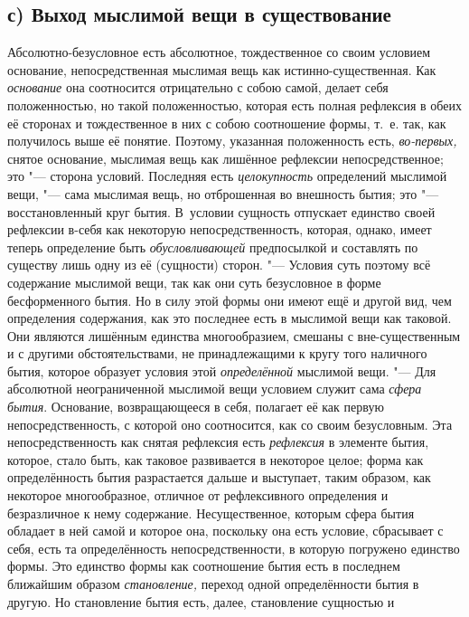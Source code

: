 \subsection%
[с) Выход мыслимой вещи в существование]%
{с) Выход мыслимой вещи в существование}

Абсолютно-безусловное есть абсолютное,
тождественное со своим условием основание, непосредственная мыслимая вещь
как истинно-существенная. Как {\em основание} она
соотносится отрицательно с собою самой, делает себя положенностью, но такой
положенностью, которая есть полная рефлексия в обеих её сторонах и
тождественное в них с собою соотношение формы, т.~е. так, как получилось
выше её понятие. Поэтому, указанная положенность есть,
{\em во-первых,} снятое основание, мыслимая вещь как
лишённое рефлексии непосредственное; это "--- сторона условий. Последняя есть
{\em целокупность} определений мыслимой вещи, "--- сама
мыслимая вещь, но отброшенная во внешность бытия; это "--- восстановленный
круг бытия. В~условии сущность отпускает единство своей рефлексии в-себя
как некоторую непосредственность, которая, однако, имеет теперь определение
быть {\em обусловливающей} предпосылкой и составлять по
существу лишь одну из её (сущности) сторон. "--- Условия суть поэтому всё
содержание мыслимой вещи, так как они суть безусловное в форме
бесформенного бытия. Но в силу этой формы они имеют ещё и другой вид, чем
определения содержания, как это последнее есть в мыслимой вещи как таковой.
Они являются лишённым единства многообразием, смешаны с вне-существенным и
с другими обстоятельствами, не принадлежащими к кругу того наличного бытия,
которое образует условия этой {\em определённой}
мыслимой вещи. "--- Для абсолютной неограниченной мыслимой вещи условием служит
сама {\em сфера бытия}. Основание, возвращающееся в
себя, полагает её как первую непосредственность, с которой оно соотносится,
как со своим безусловным. Эта непосредственность как снятая рефлексия есть
{\em рефлексия} в элементе бытия, которое, стало быть,
как таковое развивается в некоторое целое; форма как определённость бытия
разрастается дальше и выступает, таким образом, как некоторое
многообразное, отличное от рефлексивного определения и безразличное к нему
содержание. Несущественное, которым сфера бытия обладает в ней самой и
которое она, поскольку она есть условие, сбрасывает с себя, есть та
определённость непосредственности, в которую погружено единство формы. Это
единство формы как соотношение бытия есть в последнем ближайшим образом
{\em становление,} переход одной определённости бытия в
другую. Но становление бытия есть, далее, становление сущностью и
